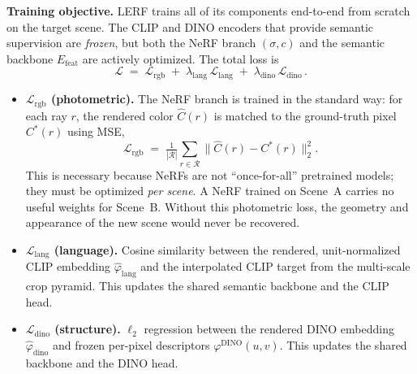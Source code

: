 \begin{enrichment}
\begin{enrichment}
        \newpage 
        
        \noindent
        \textbf{Training objective.}
        LERF trains all of its components end-to-end from scratch on the target scene. The
        CLIP and DINO encoders that provide semantic supervision are \emph{frozen},
        but both the NeRF branch $(\sigma,c)$ and the semantic backbone $E_{\text{feat}}$
        are actively optimized. The total loss is
        \[
        \mathcal{L}
        \;=\;
        \mathcal{L}_{\text{rgb}}
        \;+\;
        \lambda_{\text{lang}}\,\mathcal{L}_{\text{lang}}
        \;+\;
        \lambda_{\text{dino}}\,\mathcal{L}_{\text{dino}}\,.
        \]
        
        \begin{itemize}
            \item \textbf{$\mathcal{L}_{\text{rgb}}$ (photometric).} 
            The NeRF branch is trained in the standard way: for each ray $r$, the rendered color $\hat{C}(r)$ is matched to the ground-truth pixel $C^{\ast}(r)$ using MSE,
            \[
            \mathcal{L}_{\text{rgb}} \;=\; \tfrac{1}{|\mathcal{R}|}\sum_{r\in\mathcal{R}}\|\hat{C}(r)-C^{\ast}(r)\|_2^2.
            \]
            This is necessary because NeRFs are not “once-for-all” pretrained models; they must be optimized \emph{per scene}. A NeRF trained on Scene~A carries no useful weights for Scene~B. Without this photometric loss, the geometry and appearance of the new scene would never be recovered.
            
            \item \textbf{$\mathcal{L}_{\text{lang}}$ (language).} 
            Cosine similarity between the rendered, unit-normalized CLIP embedding
            $\hat{\varphi}_{\text{lang}}$ and the interpolated CLIP target from the
            multi-scale crop pyramid. This updates the shared semantic backbone and the CLIP head.
            
            \item \textbf{$\mathcal{L}_{\text{dino}}$ (structure).} 
            $\ell_2$ regression between the rendered DINO embedding $\hat{\varphi}_{\text{dino}}$
            and frozen per-pixel descriptors $\varphi^{\text{DINO}}(u,v)$. This updates the shared
            backbone and the DINO head.
        \end{itemize}
        

\end{enrichment}
\end{enrichment}
